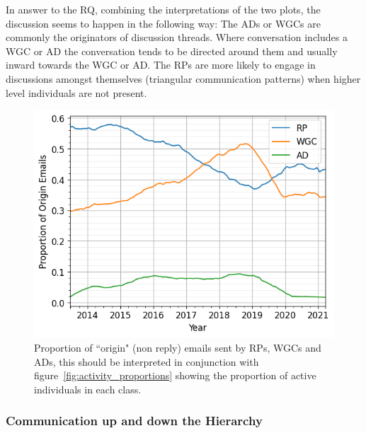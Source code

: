 \documentclass[twocolumn,10pt]{article}
\newlength{\figureWidthOneColumn}
\begin{document}
In answer to the RQ, combining the interpretations of the two plots, the
discussion seems to happen in the following way: The ADs or WGCs are
commonly the originators of discussion threads. Where conversation includes
a WGC or AD the conversation tends to be directed around them and usually
inward towards the WGC or AD. The RPs are more likely to engage in
discussions amongst themselves (triangular communication patterns) when
higher level individuals are not present. 

\begin{figure}[t]
  \centering
  \includegraphics[width=\figureWidthOneColumn]{figures-prev/icwsm-2024/Origin_email_proportions.png}
  \caption{
    Proportion of ``origin" (non reply) emails sent by RPs, WGCs and ADs,
    this should be interpreted in conjunction with
    figure~\ref{fig:activity_proportions} showing the proportion of active
    individuals in each class.
  }
  \label{fig:origin_emails}
\end{figure}

\subsubsection{Communication up and down the Hierarchy}
\label{sec:org-dyn:hierarchy:rq3}


\end{document}
